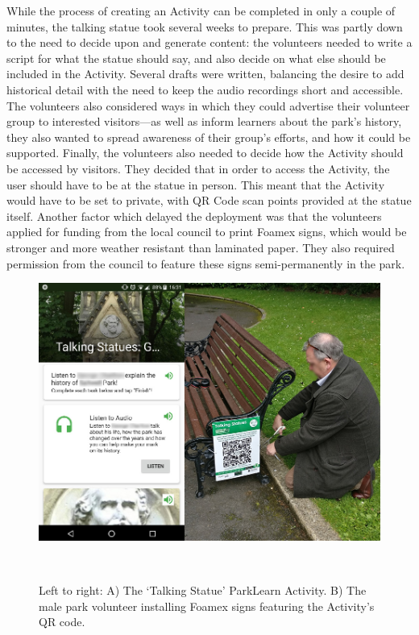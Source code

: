 While the process of creating an Activity can be completed in only a couple of minutes, the talking statue took several weeks to prepare. This was partly down to the need to decide upon and generate content: the volunteers needed to write a script for what the statue should say, and also decide on what else should be included in the Activity. Several drafts were written, balancing the desire to add historical detail with the need to keep the audio recordings short and accessible. The volunteers also considered ways in which they could advertise their volunteer group to interested visitors---as well as inform learners about the park's history, they also wanted to spread awareness of their group's efforts, and how it could be supported. Finally, the volunteers also needed to decide how the Activity should be accessed by visitors. They decided that in order to access the Activity, the user should have to be at the statue in person. This meant that the Activity would have to be set to private, with QR Code scan points provided at the statue itself. Another factor which delayed the deployment was that the volunteers applied for funding from the local council to print Foamex signs, which would be stronger and more weather resistant than laminated paper. They also required permission from the council to feature these signs semi-permanently in the park.

\begin{figure}
  \centering
  \includegraphics[width=0.8\columnwidth]{images/chapter06/TalkingStatue2.jpg}
  \caption[The ParkLearn `Talking Statue' Activity, and installing the signage ]{Left to right: A) The `Talking Statue' ParkLearn Activity. B) The male park volunteer installing Foamex signs featuring the Activity's QR code.}~\label{fig:TalkingStatueActivity}
\end{figure}

